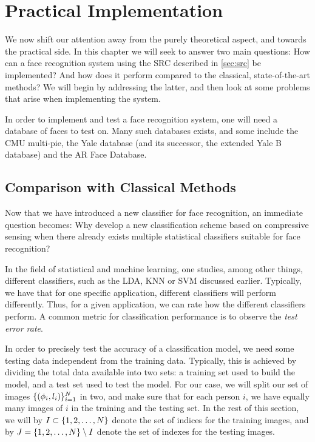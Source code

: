 \chapter{Practical Implementation}
We now shift our attention away from the purely theoretical aspect, and towards the practical side. In this chapter we will seek to answer two main questions: How can a face recognition system using the SRC described in \cref{sec:src} be implemented? And how does it perform compared to the classical, state-of-the-art methods? We will begin by addressing the latter, and then look at some problems that arise when implementing the system.

In order to implement and test a face recognition system, one will need a database of faces to test on. Many such databases exists, and some include the CMU multi-pie, the Yale database (and its successor, the extended Yale B database) and the AR Face Database. 


\section{Comparison with Classical Methods}
Now that we have introduced a new classifier for face recognition, an immediate question becomes: Why develop a new classification scheme based on compressive sensing when there already exists multiple statistical classifiers suitable for face recognition? 

In the field of statistical and machine learning, one studies, among other things, different classifiers, such as the LDA, KNN or SVM discussed earlier. Typically, we have that for one specific application, different classifiers will perform differently. Thus, for a given application, we can rate how the different classifiers perform. A common metric for classification performance is to observe the \textit{test error rate}.

In order to precisely test the accuracy of a classification model, we need some testing data independent from the training data. Typically, this is achieved by dividing the total data available into two sets: a training set used to build the model, and a test set used to test the model. For our case, we will split our set of images $ \{(\phi_{i}, l_{i})\}_{i=1}^{N} $ in two, and make sure that for each person $ i $, we have equally many images of $ i $ in the training and the testing set. In the rest of this section, we will by $ I \subset \{1, 2, \ldots, N\} $ denote the set of indices for the training images, and by $ J = \{1, 2, \ldots, N\} \setminus I $ denote the set of indexes for the testing images. 

